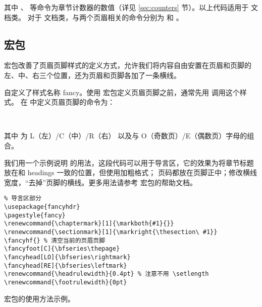 其中 、 等命令为章节计数器的数值（详见 \ref{sec:counters} 节）。以上代码适用于  文档类。
对于  文档类，与两个页眉相关的命令分别为  和 。

\subsection{ 宏包}\label{subsec:fancyhdr}

 宏包改善了页眉页脚样式的定义方式，允许我们将内容自由安置在页眉和页脚的左、中、右三个位置，还为页眉和页脚各加了一条横线。

 自定义了样式名称 fancy。使用  宏包定义页眉页脚之前，通常先用  调用这个样式。
在  中定义页眉页脚的命令为：
\begin{command}
\marg*{\ldots}\\
\marg*{\ldots}
\end{command}
其中  为 L（左）/C（中）/R（右） 以及与 O（奇数页）/E（偶数页）字母的组合。

我们用一个示例说明  的用法，这段代码可以用于导言区，它的效果为将章节标题放在和 headings 一致的位置，但使用加粗格式；
页码都放在页脚正中；修改横线宽度，“去掉”页脚的横线。更多用法请参考  宏包的帮助文档。

\begin{sourcecode}[hbp]
\begin{Verbatim}
% 导言区部分
\usepackage{fancyhdr}
\pagestyle{fancy}
\renewcommand{\chaptermark}[1]{\markboth{#1}{}}
\renewcommand{\sectionmark}[1]{\markright{\thesection\ #1}}
\fancyhf{} % 清空当前的页眉页脚
\fancyfoot[C]{\bfseries\thepage}
\fancyhead[LO]{\bfseries\rightmark}
\fancyhead[RE]{\bfseries\leftmark}
\renewcommand{\headrulewidth}{0.4pt} % 注意不用 \setlength
\renewcommand{\footrulewidth}{0pt}
\end{Verbatim}
\caption{ 宏包的使用方法示例。}\label{code:fancyhdr}
\end{sourcecode}

\endinput
